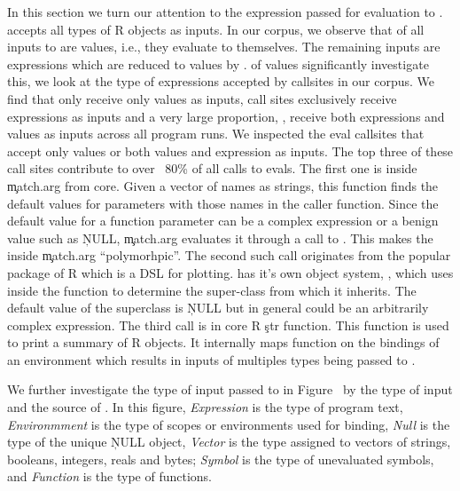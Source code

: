 \documentclass[conference]{IEEEtran}
\begin{document}
In this section we turn our attention to the expression passed for evaluation to
\eval. \eval accepts all types of R objects as inputs. In our corpus, we observe
that \AllValueInputEvalCallPerc of all inputs to \eval are values, i.e., they
evaluate to themselves. The remaining \AllExpressionInputEvalCallPerc inputs are
expressions which are reduced to values by \eval. %
of values %
significantly %
investigate this, we look at the type of expressions accepted by \eval callsites
in our corpus. We find that only \AllValueInputEvalSitePerc receive only values
as inputs, \AllExpressionInputEvalSitePerc call sites exclusively receive
expressions as inputs and a very large proportion,
\AllPolymorphicInputEvalSitePerc, receive both expressions and values as inputs
across all program runs. We inspected the eval callsites that accept only values
or both values and expression as inputs. The top three of these call sites
contribute to over ~80\% of all calls to evals. The first one is inside
\c{match.arg} from core. Given a vector of names as strings, this function finds
the default values for parameters with those names in the caller function. Since
the default value for a function parameter can be a complex expression or a
benign value such as \c{NULL}, \c{match.arg} evaluates it through a call to
\eval. This makes the \eval inside \c{match.arg} ``polymorhpic''. The second
such \eval call originates from the popular \ggplot package of R which is a DSL
for plotting. \ggplot has it's own object system, \ggproto, which uses \eval
inside the \ggproto function to determine the super-class from which it
inherits. The default value of the superclass is \c{NULL} but in general could
be an arbitrarily complex expression. The third \eval call is in core R \c{str}
function. This function is used to print a summary of R objects. It internally
maps \eval function on the bindings of an environment which results in inputs of
multiples types being passed to \eval.

We further investigate the type of input passed to \eval in
Figure~\cite{fig:eval-expression-kind} by the type of input and
the source of \eval. In this figure, \emph{Expression} is the type of program text,
\emph{Environmment} is the type of scopes or environments used for binding,
\emph{Null} is the type of the unique \c{NULL} object, \emph{Vector} is the type
assigned to vectors of strings, booleans, integers, reals and bytes;
\emph{Symbol} is the type of unevaluated symbols, and \emph{Function} is the
type of functions.
\end{document}
